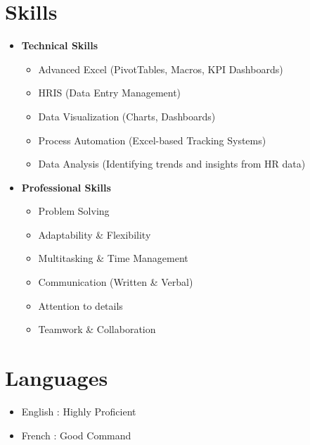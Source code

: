\documentclass[a4paper,10pt]{article}
\begin{document}
\section*{Skills}
\noindent
\begin{minipage}[t]{0.5\textwidth}
    \begin{itemize}[leftmargin=0.15in, label={}, noitemsep, topsep=0pt]
        \item \textbf{Technical Skills}
        \begin{itemize}[leftmargin=0.2in, topsep=2pt, itemsep=-2pt]
            \item Advanced Excel (PivotTables, Macros, KPI Dashboards)
            \item HRIS (Data Entry Management)
            \item Data Visualization (Charts, Dashboards)
            \item Process Automation (Excel-based Tracking Systems)
            \item Data Analysis (Identifying trends and insights from HR data)
        \end{itemize}
    \end{itemize}
\end{minipage}%
\begin{minipage}[t]{0.5\textwidth}
    \begin{itemize}[leftmargin=0.15in, label={}, noitemsep, topsep=0pt]
        \item \textbf{Professional Skills}
        \begin{itemize}[leftmargin=0.2in, topsep=2pt, itemsep=-2pt]
            \item Problem Solving
            \item Adaptability \& Flexibility
            \item Multitasking \& Time Management
            \item Communication (Written \& Verbal)
            \item Attention to details
            \item Teamwork \& Collaboration
        \end{itemize}
    \end{itemize}
\end{minipage}



\section*{Languages}
\begin{itemize}[leftmargin=0.15in, topsep=0pt]
    \item English : Highly Proficient
    \item French : Good Command
\end{itemize}
\end{document}
